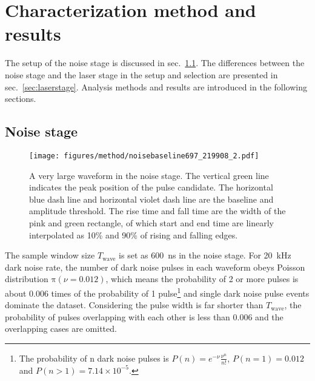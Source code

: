\section{Characterization method and results}
\label{Method}
The setup of the noise stage is discussed in sec.~\ref{sec:noisestage}. The differences between the noise stage and the laser stage in the setup and selection are presented in sec.~\ref{sec:laserstage}. Analysis methods and results are introduced in the following sections.
\subsection{Noise stage}
\label{sec:noisestage}
\begin{figure}[!htbp]
    \centering
    \texttt{[image: figures/method/noisebaseline697\_219908\_2.pdf]}
    \caption{A very large waveform in the noise stage. The vertical green line indicates the peak position of the pulse candidate. The horizontal blue dash line and horizontal violet dash line are the baseline and amplitude threshold. The rise time and fall time are the width of the pink and green rectangle, of which start and end time are linearly interpolated as 10\% and 90\% of rising and falling edges.}
    \label{fig:baseline1}
\end{figure}

The sample window size $T_{\mathrm{wave}}$ is set as \SI{600}{ns} in the noise stage. For \SI{20}{kHz} dark noise rate, the number of dark noise pulses in each waveform obeys Poisson distribution $\mathrm{\pi}(\nu=0.012)$, which means the probability of 2 or more pulses is about 0.006 times of the probability of 1 pulse\footnote{The probability of n dark noise pulses is $P(n)=e^{-\nu}\frac{\nu^n}{n!}$, $P(n=1)=0.012$ and $P(n>1)=7.14\times10^{-5}$.} and single dark noise pulse events dominate the dataset. Considering the pulse width is far shorter than $T_{\mathrm{wave}}$, the probability of pulses overlapping with each other is less than 0.006 and the overlapping cases are omitted.


